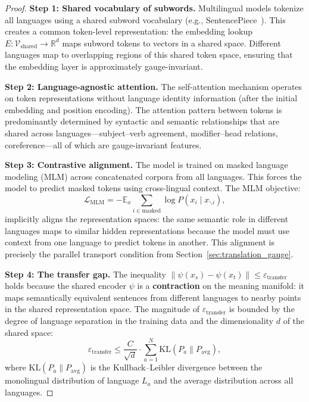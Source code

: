 \documentclass[12pt,a4paper]{article}
\theoremstyle{remark}
\newcommand{\R}{\mathbb{R}}
\newcommand{\E}{\mathbb{E}}
\newcommand{\loss}{\mathcal{L}}
\newcommand{\Vocab}{\mathcal{V}}
\begin{document}
\begin{proof}
\noindent\textbf{Step 1: Shared vocabulary of subwords.}
Multilingual models tokenize all languages using a shared subword
vocabulary (e.g., SentencePiece~\cite{kudo2018sentencepiece}). This
creates a common token-level representation: the embedding lookup
$E: \Vocab_{\text{shared}} \to \R^d$ maps subword tokens to vectors
in a shared space. Different languages map to overlapping regions of
this shared token space, ensuring that the embedding layer is
approximately gauge-invariant.

\smallskip
\noindent\textbf{Step 2: Language-agnostic attention.}
The self-attention mechanism operates on token representations
without language identity information (after the initial embedding
and position encoding). The attention pattern between tokens is
predominantly determined by syntactic and semantic relationships
that are shared across languages---subject--verb agreement, modifier--head
relations, coreference---all of which are gauge-invariant features.

\smallskip
\noindent\textbf{Step 3: Contrastive alignment.}
The model is trained on masked language modeling (MLM) across
concatenated corpora from all languages. This forces the model to
predict masked tokens using cross-lingual context. The MLM objective:
\begin{equation}
  \loss_{\text{MLM}} = -\E_{x} \sum_{i \in \text{masked}}
    \log P(x_i \mid x_{\backslash i}),
\end{equation}
implicitly aligns the representation spaces: the same semantic role
in different languages maps to similar hidden representations because
the model must use context from one language to predict tokens in
another. This alignment is precisely the parallel transport condition
from Section~\ref{sec:translation_gauge}.

\smallskip
\noindent\textbf{Step 4: The transfer gap.}
The inequality $\|\psi(x_s) - \psi(x_t)\| \leq \varepsilon_{\text{transfer}}$
holds because the shared encoder $\psi$ is a \textbf{contraction}
on the meaning manifold: it maps semantically equivalent sentences
from different languages to nearby points in the shared representation
space. The magnitude of $\varepsilon_{\text{transfer}}$ is bounded by
the degree of language separation in the training data and the
dimensionality $d$ of the shared space:
\begin{equation}
  \varepsilon_{\text{transfer}} \leq \frac{C}{\sqrt{d}} \cdot \sum_{a=1}^N
    \text{KL}(P_a \| P_{\text{avg}}),
\end{equation}
where $\text{KL}(P_a \| P_{\text{avg}})$ is the Kullback--Leibler
divergence between the monolingual distribution of language $L_a$
and the average distribution across all languages.
\end{proof}
\end{document}
